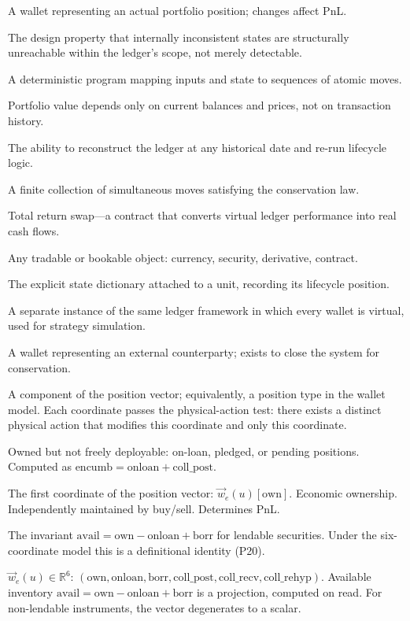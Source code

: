 \documentclass[11pt,a4paper]{article}
\begin{document}
\begin{description}[style=nextline]
\item[Real wallet] A wallet representing an actual portfolio position; changes affect PnL.
\item[Self-consistency] The design property that internally inconsistent states are structurally unreachable within the ledger's scope, not merely detectable.
\item[Smart contract] A deterministic program mapping inputs and state to sequences of atomic moves.
\item[State-sufficiency] Portfolio value depends only on current balances and prices, not on transaction history.
\item[Time travel] The ability to reconstruct the ledger at any historical date and re-run lifecycle logic.
\item[Transaction] A finite collection of simultaneous moves satisfying the conservation law.
\item[TRS] Total return swap---a contract that converts virtual ledger performance into real cash flows.
\item[Unit] Any tradable or bookable object: currency, security, derivative, contract.
\item[Unit state] The explicit state dictionary attached to a unit, recording its lifecycle position.
\item[Virtual ledger] A separate instance of the same ledger framework in which every wallet is virtual, used for strategy simulation.
\item[Virtual wallet] A wallet representing an external counterparty; exists to close the system for conservation.
\item[Coordinate] A component of the position vector; equivalently, a position type in the wallet model. Each coordinate passes the physical-action test: there exists a distinct physical action that modifies this coordinate and only this coordinate.
\item[Encumbrance] Owned but not freely deployable: on-loan, pledged, or pending positions. Computed as $\mathrm{encumb} = \mathrm{onloan} + \mathrm{coll\_post}$.
\item[Own] The first coordinate of the position vector: $\vec{w}_e(u)[\mathrm{own}]$. Economic ownership. Independently maintained by buy/sell. Determines PnL.
\item[Ownership consistency] The invariant $\mathrm{avail} = \mathrm{own} - \mathrm{onloan} + \mathrm{borr}$ for lendable securities. Under the six-coordinate model this is a definitional identity (P20).
\item[Position vector] $\vec{w}_e(u) \in \mathbb{R}^6$: $(\mathrm{own}, \mathrm{onloan}, \mathrm{borr}, \mathrm{coll\_post}, \mathrm{coll\_recv}, \mathrm{coll\_rehyp})$. Available inventory $\mathrm{avail} = \mathrm{own} - \mathrm{onloan} + \mathrm{borr}$ is a projection, computed on read. For non-lendable instruments, the vector degenerates to a scalar.

\end{description}
\end{document}

